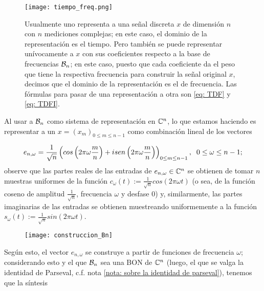 \begin{figure}[H]
\centering\captionsetup{format = hang}
	\begin{measuredfigure}
		\texttt{[image: tiempo\_freq.png]} 
		\caption{Usualmente uno representa a una señal discreta
		$x$ de dimensión $n$ con $n$ mediciones complejas; en este caso, el dominio
		de la representación es el tiempo. Pero
		también se puede representar unívocamente a $x$ con sus
		coeficientes respecto a la base de frecuencias 
		$\mathcal{B}_{n}$; en este caso, puesto que cada coeficiente da
		el peso que tiene la respectiva frecuencia para construir la 
		señal original $x$, decimos que el dominio de la representación
		es el de frecuencia. Las fórmulas para pasar de una
		representación a otra son \eqref{eq: TDF} y \eqref{eq: TDFI}.}
 	\end{measuredfigure}
\end{figure}


Al usar a $\mathcal{B}_{n}$ como sistema de representación en
$\mathbb{C}^{n}$, lo que estamos haciendo es representar a
un $x = (x_{m})_{0 \leq m \leq n-1}$ como combinación
lineal de los vectores 

\[
e_{n,\omega} = \frac{1}{\sqrt{n}} \left( cos
\left( 2 \pi \omega \frac{m}{n} \right)
+ i sen \left( 2 \pi \omega \frac{m}{n}\right) \right)_{0\leq m \leq n-1},
\hspace{0.2cm} 0 \leq \omega \leq n-1;
\]
observe que las partes reales de las
entradas de $e_{n,\omega} \in \mathbb{C}^{n}$ se obtienen de tomar $n$
muestras uniformes de la función 
$c_{\omega}(t) := \frac{1}{\sqrt{n}} cos (2 \pi \omega t)$ (o sea, de la función
coseno de amplitud $\frac{1}{\sqrt{n}}$, frecuencia $\omega$ y desfase $0$)
y, similarmente,
las partes imaginarias de las entradas se obtienen muestreando
uniformemente a la función 
$s_{\omega}(t) := \frac{1}{\sqrt{n}}  sin (2 \pi \omega t)$.

\begin{figure}[H]
	\centering
	\texttt{[image: construccion\_Bn]} 
\end{figure}	

Según esto, el vector $e_{n,\omega}$ se construye a partir
de funciones de frecuencia $\omega$; considerando esto
y el que $\mathcal{B}_{n}$ sea una BON de $\mathbb{C}^{n}$ (luego, el
que se valga la identidad de Parseval,
c.f. nota \ref{nota: sobre la identidad de parseval}), tenemos que
la síntesis

